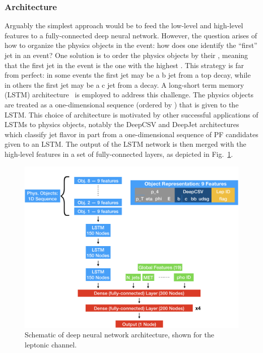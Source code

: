 \subsubsection{Architecture}
Arguably the simplest approach would be to feed the low-level and high-level features to a fully-connected deep neural network.
However, the question arises of how to organize the physics objects in the event: how does one identify the ``first'' jet in an event?
One solution is to order the physics objects by their \pT, meaning that the first jet in the event is the one with the highest \pT.
This strategy is far from perfect: in some \ttH events the first jet may be a b jet from a top decay, while in others the first jet may be a c jet from a \PW decay.
A long-short term memory (LSTM) architecture~\cite{lstm} is employed to address this challenge.
The physics objects are treated as a one-dimensional sequence (ordered by \pT) that is given to the LSTM.
This choice of architecture is motivated by other successful applications of LSTMs to physics objects, notably the DeepCSV and DeepJet architectures which classify jet flavor in part from a one-dimensional sequence of PF candidates given to an LSTM.
The output of the LSTM network is then merged with the high-level features in a set of fully-connected layers, as depicted in Fig.~\ref{fig:tth_dnn_diagram}.
\begin{figure}[h]
    \centering
    \includegraphics[width=0.7\linewidth]{figures/tth/leptonic_dnn_diagram.png}
    \caption{Schematic of deep neural network architecture, shown for the leptonic channel.}
    \label{fig:tth_dnn_diagram}
\end{figure}

